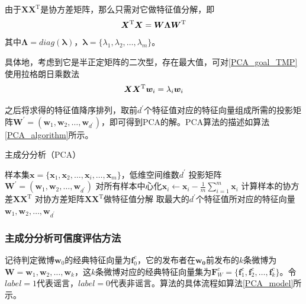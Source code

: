 \documentclass[a4paper,AutoFakeBold,oneside,12pt]{book}
\begin{document}
由于$\bm{X}\bm{X}^ \mathrm{ T }$是协方差矩阵，那么只需对它做特征值分解，即
\begin{equation}
\label{PCA_eigenvalue}
\bm{X}^ \mathrm{ T }\bm{X} = \bm{W}\bm{\Lambda}\bm{W}^ \mathrm{ T } \\
\end{equation}
其中$\bm{\Lambda}=diag(\bm{\lambda})$，$\bm{\lambda} = \{\lambda_1,\lambda_2,\ldots,\lambda_m\}$。

具体地，考虑到它是半正定矩阵的二次型，存在最大值，可对\eqref{PCA_goal_TMP}使用拉格朗日乘数法
\begin{equation}
\bm{X}\bm{X}^ \mathrm{ T }\bm{w}_i  = \lambda_i \bm{w}_i \\
\end{equation}

之后将求得的特征值降序排列，取前$d^\prime$个特征值对应的特征向量组成所需的投影矩阵$\bm{W}^\prime =(\bm{w}_1,\bm{w}_2,\ldots,\bm{w}_{d^\prime})$，即可得到PCA的解。PCA算法的描述如算法\ref{PCA_algorithm}所示。
\begin{algorithm} 
\caption{主成分分析（PCA）} 
\label{PCA_algorithm}
\renewcommand{\algorithmicrequire}{\textbf{输入：}}
\renewcommand{\algorithmicensure}{\textbf{输出：}} 
\begin{algorithmic}[1] 
\Require 样本集$\bm{x}=\{\bm{x}_1,\bm{x}_2,\ldots,\bm{x}_i,\ldots,\bm{x}_m\}$，低维空间维数$d^\prime$ 
\Ensure 投影矩阵  $\bm{W}^\prime =(\bm{w}_1,\bm{w}_2,\ldots,\bm{w}_{d^\prime})$
\State 对所有样本中心化$\bm{x}_i \gets \bm{x}_i - \frac{1}{m}\sum_{i=1}^m \bm{x}_i$
\State  计算样本的协方差$\bm{X}\bm{X}^ \mathrm{T}$
\State 对协方差矩阵$\bm{X}\bm{X}^ \mathrm{T}$做特征值分解
\State 取最大的$d^\prime$个特征值所对应的特征向量$\bm{w}_1,\bm{w}_2,\ldots,\bm{w}_{d^\prime}$
\end{algorithmic}  
\end{algorithm}

\subsubsection{主成分分析可信度评估方法}
记待判定微博$\bm{w}_0$的经典特征向量为$\bm{f}^{c}_{0}$，它的发布者在$\bm{w_0}$前发布的$k$条微博为$\bm{W} = \bm{w}_1,\bm{w}_2,\ldots,\bm{w}_k$，这$k$条微博对应的经典特征向量集为$\bm{F}^{c}_{W} = \{ \bm{f}^{c}_{1},\bm{f}^{c}_{2},\ldots,\bm{f}^{c}_{k} \}$。令$label = 1$代表谣言，$label = 0$代表非谣言。算法的具体流程如算法\ref{PCA_model}所示。
\end{document}
